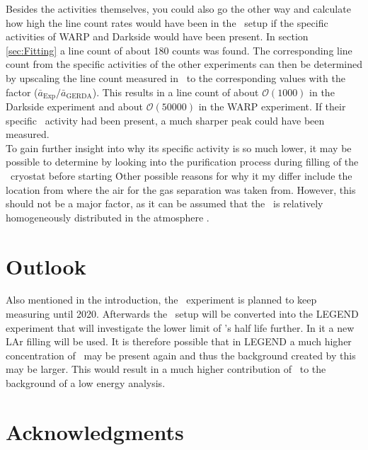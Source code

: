\documentclass[encoding=utf8,british]{tumphthesis}
\begin{document}
Besides the activities themselves, you could also go the other way and calculate how high the line count rates would have been in the \gerda\ setup if the specific activities of WARP and Darkside would have been present.
In section \ref{sec:Fitting} a line count of about 180 counts was found.
The corresponding line count from the specific activities of the other experiments can then be determined by upscaling the line count measured in \gerda\ to the corresponding values with the factor ($\bar{a}_{\mathrm{Exp}}/\bar{a}_{\mathrm{GERDA}}$).
This results in a line count of about $\mathcal{O}(1000)$ in the Darkside experiment and about $\mathcal{O}(50000)$ in the WARP experiment.
If their specific \Kr\ activity had been present, a much sharper peak could have been measured.
\\

To gain further insight into why its specific activity is so much lower, it may be possible to determine by looking into the purification process during filling of the \gerda\ cryostat before starting \PI\.
Other possible reasons for why it my differ include the location from where the air for the gas separation was taken from.
However, this should not be a major factor, as it can be assumed that the \Kr\ is relatively homogeneously distributed in the atmosphere \cite{j._jacob_atmospheric_1987}.
\\

\section{Outlook}
Also mentioned in the introduction, the \gerda\ experiment is planned to keep measuring until 2020.
Afterwards the \gerda\ setup will be converted into the LEGEND experiment that will investigate the lower limit of 's half life further.
In it a new LAr filling will be used.
It is therefore possible that in LEGEND a much higher concentration of \Kr\ may be present again and thus the background created by this may be larger.
This would result in a much higher contribution of \Kr\ to the background of a low energy analysis.
\\





\newpage
\section*{Acknowledgments}




\backmatter



\listoffigures
\listoftables
\end{document}
